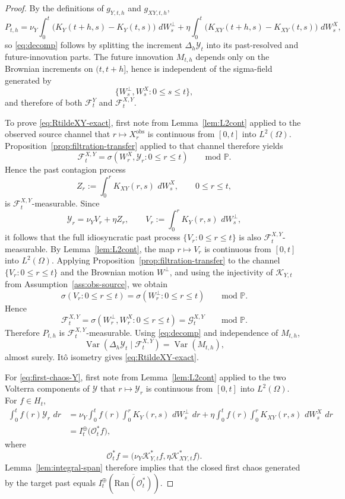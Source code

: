 \documentclass[11pt,a4paper]{amsart}
\theoremstyle{plain}
\theoremstyle{definition}
\theoremstyle{remark}
\DeclareMathOperator{\Var}{Var}
\newcommand{\PP}{\mathbb{P}}
\newcommand{\dd}{\,d}
\begin{document}
\begin{proof}
By the definitions of $g_{Y,t,h}$ and $g_{XY,t,h}$,
\[
P_{t,h}
=
\nu_Y\int_0^t \bigl(K_Y(t+h,s)-K_Y(t,s)\bigr)\,\dd W_s^\perp
+ \eta\int_0^t \bigl(K_{XY}(t+h,s)-K_{XY}(t,s)\bigr)\,\dd W_s^X,
\]
so \eqref{eq:decomp} follows by splitting the increment $\Delta_h\mathcal Y_t$ into its
past-resolved and future-innovation parts. The future innovation $M_{t,h}$ depends only on
the Brownian increments on $(t,t+h]$, hence is independent of the sigma-field generated by
\[
\{W_s^\perp,W_s^X:0\le s\le t\},
\]
and therefore of both $\mathcal F_t^Y$ and $\mathcal F_t^{X,Y}$.

To prove \eqref{eq:RtildeXY-exact}, first note from Lemma~\ref{lem:L2cont} applied to the
observed source channel that $r\mapsto X_r^{\mathrm{obs}}$ is continuous from $[0,t]$ into
$L^2(\Omega)$. Proposition~\ref{prop:filtration-transfer} applied to that
channel therefore yields
\[
\mathcal F_t^{X,Y}
=
\sigma(W_r^X,\mathcal Y_r:0\le r\le t)
\qquad\text{mod }\PP.
\]
Hence the past contagion process
\[
Z_r:=\int_0^r K_{XY}(r,s)\,\dd W_s^X,
\qquad 0\le r\le t,
\]
is $\mathcal F_t^{X,Y}$-measurable. Since
\[
\mathcal Y_r=\nu_Y V_r+\eta Z_r,
\qquad
V_r:=\int_0^r K_Y(r,s)\,\dd W_s^\perp,
\]
it follows that the full idiosyncratic past process $\{V_r:0\le r\le t\}$ is also
$\mathcal F_t^{X,Y}$-measurable. By Lemma~\ref{lem:L2cont}, the map $r\mapsto V_r$ is
continuous from $[0,t]$ into $L^2(\Omega)$. Applying
Proposition~\ref{prop:filtration-transfer} to the channel $\{V_r:0\le r\le t\}$ and the
Brownian motion $W^\perp$, and using the injectivity of $\mathcal K_{Y,t}$ from
Assumption~\ref{ass:obs-source}, we obtain
\[
\sigma(V_r:0\le r\le t)
=
\sigma(W_r^\perp:0\le r\le t)
\qquad\text{mod }\PP.
\]
Hence
\[
\mathcal F_t^{X,Y}
=
\sigma(W_r^\perp,W_r^X:0\le r\le t)
=
\mathcal G_t^{X,Y}
\qquad\text{mod }\PP.
\]
Therefore $P_{t,h}$ is $\mathcal F_t^{X,Y}$-measurable. Using \eqref{eq:decomp} and
independence of $M_{t,h}$,
\[
\Var(\Delta_h\mathcal Y_t\mid \mathcal F_t^{X,Y})=\Var(M_{t,h}),
\]
almost surely. It\^o isometry gives \eqref{eq:RtildeXY-exact}.

For \eqref{eq:first-chaos-Y}, first note from Lemma~\ref{lem:L2cont} applied to the
two Volterra components of $\mathcal Y$ that $r\mapsto \mathcal Y_r$ is continuous from
$[0,t]$ into $L^2(\Omega)$. For $f\in H_t$,
\begin{align*}
\int_0^t f(r)\mathcal Y_r\,\dd r
&=
\nu_Y\int_0^t f(r)\int_0^r K_Y(r,s)\,\dd W_s^\perp\,\dd r
+ \eta\int_0^t f(r)\int_0^r K_{XY}(r,s)\,\dd W_s^X\,\dd r \\
&=
I_t^\oplus\bigl(\mathcal O_t^* f\bigr),
\end{align*}
where
\[
\mathcal O_t^*f=\bigl(\nu_Y\mathcal K_{Y,t}^*f,\eta\mathcal K_{XY,t}^*f\bigr).
\]
Lemma~\ref{lem:integral-span} therefore implies that the closed first chaos generated by
the target past equals
$I_t^\oplus(\overline{\mathrm{Ran}(\mathcal O_t^*)})$.


\end{proof}
\end{document}
